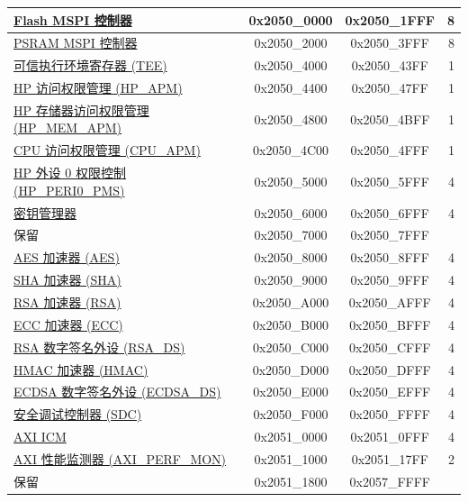 \begin{ThreePartTable}
\begin{longtable}[c]{ |p{7cm}|c|c|r| }
    \hyperref[mod:spi]{Flash MSPI 控制器} & 0x2050\_0000 & 0x2050\_1FFF &   8\\\hline
    \hyperref[mod:spi]{PSRAM MSPI 控制器} & 0x2050\_2000 & 0x2050\_3FFF &   8\\\hline
    \hyperref[mod:permctrl]{可信执行环境寄存器 (TEE)} & 0x2050\_4000 & 0x2050\_43FF &   1\\\hline
    \hyperref[mod:permctrl]{HP 访问权限管理 (HP\_APM)} & 0x2050\_4400 & 0x2050\_47FF &   1\\\hline
    \hyperref[mod:permctrl]{HP 存储器访问权限管理 (HP\_MEM\_APM)} & 0x2050\_4800 & 0x2050\_4BFF &   1\\\hline
    \hyperref[mod:permctrl]{CPU 访问权限管理 (CPU\_APM)} & 0x2050\_4C00 & 0x2050\_4FFF &   1\\\hline
    \hyperref[mod:permctrl]{HP 外设 0 权限控制 (HP\_PERI0\_PMS)} & 0x2050\_5000 & 0x2050\_5FFF &   4\\\hline
    \hyperref[mod:keymng]{密钥管理器}      & 0x2050\_6000 & 0x2050\_6FFF &   4\\\hline
        \rowcolor{gray!25}  保留          & 0x2050\_7000 & 0x2050\_7FFF &    \\\hline
    \hyperref[mod:aes]{AES 加速器 (AES)} & 0x2050\_8000 & 0x2050\_8FFF &   4\\\hline
    \hyperref[mod:sha]{SHA 加速器 (SHA)} & 0x2050\_9000 & 0x2050\_9FFF &   4\\\hline
    \hyperref[mod:rsa]{RSA 加速器 (RSA)} & 0x2050\_A000 & 0x2050\_AFFF &   4\\\hline
    \hyperref[mod:ecc]{ECC 加速器 (ECC)} & 0x2050\_B000 & 0x2050\_BFFF &   4\\\hline
    \hyperref[mod:rsads]{RSA 数字签名外设 (RSA\_DS)} & 0x2050\_C000 & 0x2050\_CFFF &   4\\\hline
    \hyperref[mod:hmac]{HMAC 加速器 (HMAC)} & 0x2050\_D000 & 0x2050\_DFFF &   4\\\hline
    \hyperref[mod:ecdsa]{ECDSA 数字签名外设 (ECDSA\_DS)} & 0x2050\_E000 & 0x2050\_EFFF &   4\\\hline
    \hyperref[mod:sdc]{安全调试控制器 (SDC)} & 0x2050\_F000 & 0x2050\_FFFF &   4\\\hline
    \hyperref[mod:sysreg]{AXI ICM}                         & 0x2051\_0000 & 0x2051\_0FFF &   4\\\hline
    \hyperref[mod:aximon]{AXI 性能监测器 (AXI\_PERF\_MON)} & 0x2051\_1000 & 0x2051\_17FF &   2\\\hline
        \rowcolor{gray!25}  保留          & 0x2051\_1800 & 0x2057\_FFFF &    \\\hline

\end{longtable}
\end{ThreePartTable}
